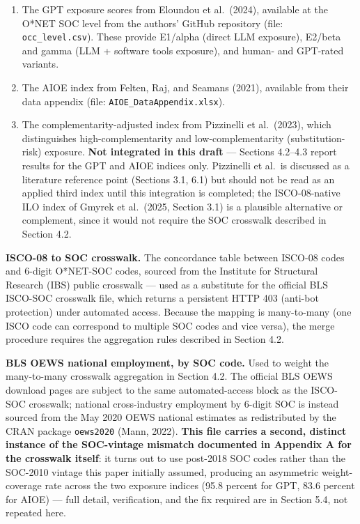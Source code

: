 \documentclass[
  11pt,
]{article}
\providecommand{\tightlist}{%
  \setlength{\itemsep}{0pt}\setlength{\parskip}{0pt}}
\begin{document}
\begin{enumerate}
\def\labelenumi{\arabic{enumi}.}
\tightlist
\item
  The GPT exposure scores from Eloundou et al.~(2024), available at the
  O*NET SOC level from the authors' GitHub repository (file:
  \texttt{occ\_level.csv}). These provide E1/alpha (direct LLM
  exposure), E2/beta and gamma (LLM + software tools exposure), and
  human- and GPT-rated variants.
\item
  The AIOE index from Felten, Raj, and Seamans (2021), available from
  their data appendix (file: \texttt{AIOE\_DataAppendix.xlsx}).
\item
  The complementarity-adjusted index from Pizzinelli et al.~(2023),
  which distinguishes high-complementarity and low-complementarity
  (substitution-risk) exposure. \textbf{Not integrated in this draft}
  --- Sections 4.2--4.3 report results for the GPT and AIOE indices
  only. Pizzinelli et al.~is discussed as a literature reference point
  (Sections 3.1, 6.1) but should not be read as an applied third index
  until this integration is completed; the ISCO-08-native ILO index of
  Gmyrek et al.~(2025, Section 3.1) is a plausible alternative or
  complement, since it would not require the SOC crosswalk described in
  Section 4.2.
\end{enumerate}

\textbf{ISCO-08 to SOC crosswalk.} The concordance table between ISCO-08
codes and 6-digit O*NET-SOC codes, sourced from the Institute for
Structural Research (IBS) public crosswalk --- used as a substitute for
the official BLS ISCO-SOC crosswalk file, which returns a persistent
HTTP 403 (anti-bot protection) under automated access. Because the
mapping is many-to-many (one ISCO code can correspond to multiple SOC
codes and vice versa), the merge procedure requires the aggregation
rules described in Section 4.2.

\textbf{BLS OEWS national employment, by SOC code.} Used to weight the
many-to-many crosswalk aggregation in Section 4.2. The official BLS OEWS
download pages are subject to the same automated-access block as the
ISCO-SOC crosswalk; national cross-industry employment by 6-digit SOC is
instead sourced from the May 2020 OEWS national estimates as
redistributed by the CRAN package \texttt{oews2020} (Mann, 2022).
\textbf{This file carries a second, distinct instance of the SOC-vintage
mismatch documented in Appendix A for the crosswalk itself}: it turns
out to use post-2018 SOC codes rather than the SOC-2010 vintage this
paper initially assumed, producing an asymmetric weight-coverage rate
across the two exposure indices (95.8 percent for GPT, 83.6 percent for
AIOE) --- full detail, verification, and the fix required are in Section
5.4, not repeated here.
\end{document}
